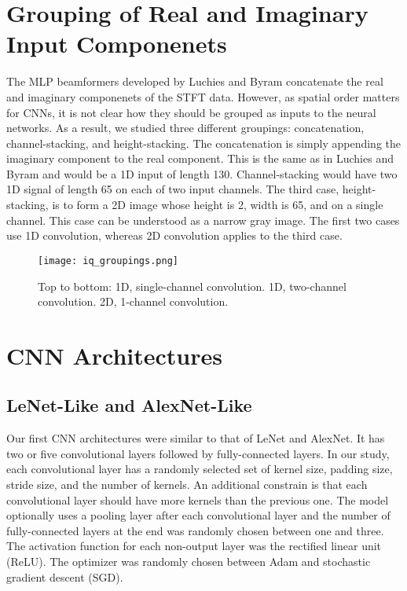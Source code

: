 \section{Grouping of Real and Imaginary Input Componenets}
The MLP beamformers developed by Luchies and Byram concatenate the real and imaginary componenets of the STFT data. However, as spatial order matters for CNNs, it is not clear how they should be grouped as inputs to the neural networks. As a result, we studied three different groupings: concatenation, channel-stacking, and height-stacking. The concatenation is simply appending the imaginary component to the real component. This is the same as in Luchies and Byram and would be a 1D input of length 130. Channel-stacking would have two 1D signal of length 65 on each of two input channels. The third case, height-stacking, is to form a 2D image whose height is 2, width is 65, and on a single channel. This case can be understood as a narrow gray image. The first two cases use 1D convolution, whereas 2D convolution applies to the third case.

\begin{figure}
  \centerline{\texttt{[image: iq\_groupings.png]}}
  \caption{Top to bottom: 1D, single-channel convolution. 1D, two-channel convolution. 2D, 1-channel convolution.}
  \label{fig}
\end{figure}


\section{CNN Architectures}
  \subsection{LeNet-Like and AlexNet-Like}
  Our first CNN architectures were similar to that of LeNet and AlexNet. It has two or five convolutional layers followed by fully-connected layers. In our study, each convolutional layer has a randomly selected set of kernel size, padding size, stride size, and the number of kernels. An additional constrain is that each convolutional layer should have more kernels than the previous one. The model optionally uses a pooling layer after each convolutional layer and the number of fully-connected layers at the end was randomly chosen between one and three. The activation function for each non-output layer was the rectified linear unit (ReLU). The optimizer was randomly chosen between Adam and stochastic gradient descent (SGD).


